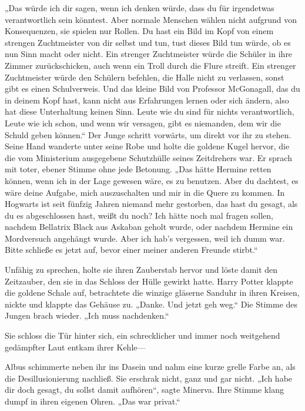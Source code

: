 {„Das würde ich dir sagen, wenn ich denken würde, dass du für irgendetwas verantwortlich sein könntest. Aber normale Menschen wählen nicht aufgrund von Konsequenzen, sie spielen nur Rollen. Du hast ein Bild im Kopf von einem strengen Zuchtmeister von dir selbst und tun, tust dieses Bild tun würde, ob es nun Sinn macht oder nicht. Ein strenger Zuchtmeister würde die Schüler in ihre Zimmer zurückschicken, auch wenn ein Troll durch die Flure streift. Ein strenger Zuchtmeister würde den Schülern befehlen, die Halle nicht zu verlassen, sonst gibt es einen Schulverweis. Und das kleine Bild von Professor McGonagall, das du in deinem Kopf hast, kann nicht aus Erfahrungen lernen oder sich ändern, also hat diese Unterhaltung keinen Sinn. Leute wie du sind für nichts verantwortlich, Leute wie ich schon, und wenn wir versagen, gibt es niemanden, dem wir die Schuld geben können.“ Der Junge schritt vorwärts, um direkt vor ihr zu stehen. Seine Hand wanderte unter seine Robe und holte die goldene Kugel hervor, die die vom Ministerium ausgegebene Schutzhülle seines Zeitdrehers war. Er sprach mit toter, ebener Stimme ohne jede Betonung. „Das hätte Hermine retten können, wenn ich in der Lage gewesen wäre, es zu benutzen. Aber du dachtest, es wäre deine Aufgabe, mich auszuschalten und mir in die Quere zu kommen. In Hogwarts ist seit fünfzig Jahren niemand mehr gestorben, das hast du gesagt, als du es abgeschlossen hast, weißt du noch? Ich hätte noch mal fragen sollen, nachdem Bellatrix Black aus Askaban geholt wurde, oder nachdem Hermine ein Mordversuch angehängt wurde. Aber ich hab's vergessen, weil ich dumm war. Bitte schließe es jetzt auf, bevor einer meiner anderen Freunde stirbt.“

Unfähig zu sprechen, holte sie ihren Zauberstab hervor und löste damit den Zeitzauber, den sie in das Schloss der Hülle gewirkt hatte. Harry Potter klappte die goldene Schale auf, betrachtete die winzige gläserne Sanduhr in ihren Kreisen, nickte und klappte das Gehäuse zu. „Danke. Und jetzt geh weg.“ Die Stimme des Jungen brach wieder. „Ich muss nachdenken.“

Sie schloss die Tür hinter sich, ein schrecklicher und immer noch weitgehend gedämpfter Laut entkam ihrer Kehle—

Albus schimmerte neben ihr ins Dasein und nahm eine kurze grelle Farbe an, als die Desillusionierung nachließ. Sie erschrak nicht, ganz und gar nicht. „Ich habe dir doch gesagt, du sollst damit aufhören“, sagte Minerva. Ihre Stimme klang dumpf in ihren eigenen Ohren. „Das war privat.“

}

